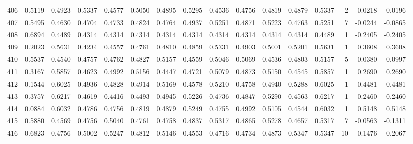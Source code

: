 \begin{tabular}{lrrrrrrrrrrrrrrr}
406 &      0.5119 &  0.4923 &  0.5337 &  0.4577 &  0.5050 &  0.4895 &  0.5295 &  0.4536 &  0.4756 &  0.4819 &   0.4879 &     0.5337 &      2 &                    0.0218 &                    -0.0196 \\
407 &      0.5495 &  0.4630 &  0.4704 &  0.4733 &  0.4824 &  0.4764 &  0.4937 &  0.5251 &  0.4871 &  0.5223 &   0.4763 &     0.5251 &      7 &                   -0.0244 &                    -0.0865 \\
408 &      0.6894 &  0.4489 &  0.4314 &  0.4314 &  0.4314 &  0.4314 &  0.4314 &  0.4314 &  0.4314 &  0.4314 &   0.4314 &     0.4489 &      1 &                   -0.2405 &                    -0.2405 \\
409 &      0.2023 &  0.5631 &  0.4234 &  0.4557 &  0.4761 &  0.4810 &  0.4859 &  0.5331 &  0.4903 &  0.5001 &   0.5201 &     0.5631 &      1 &                    0.3608 &                     0.3608 \\
410 &      0.5537 &  0.4540 &  0.4757 &  0.4762 &  0.4827 &  0.5157 &  0.4559 &  0.5046 &  0.5069 &  0.4536 &   0.4803 &     0.5157 &      5 &                   -0.0380 &                    -0.0997 \\
411 &      0.3167 &  0.5857 &  0.4623 &  0.4992 &  0.5156 &  0.4447 &  0.4721 &  0.5079 &  0.4873 &  0.5150 &   0.4545 &     0.5857 &      1 &                    0.2690 &                     0.2690 \\
412 &      0.1544 &  0.6025 &  0.4936 &  0.4828 &  0.4914 &  0.5169 &  0.4578 &  0.5210 &  0.4758 &  0.4940 &   0.5288 &     0.6025 &      1 &                    0.4481 &                     0.4481 \\
413 &      0.3757 &  0.6217 &  0.4619 &  0.4416 &  0.4493 &  0.4945 &  0.5226 &  0.4736 &  0.4847 &  0.5290 &   0.4563 &     0.6217 &      1 &                    0.2460 &                     0.2460 \\
414 &      0.0884 &  0.6032 &  0.4786 &  0.4756 &  0.4819 &  0.4879 &  0.5249 &  0.4755 &  0.4992 &  0.5105 &   0.4544 &     0.6032 &      1 &                    0.5148 &                     0.5148 \\
415 &      0.5880 &  0.4569 &  0.4756 &  0.5040 &  0.4761 &  0.4758 &  0.4837 &  0.5317 &  0.4865 &  0.5278 &   0.4657 &     0.5317 &      7 &                   -0.0563 &                    -0.1311 \\
416 &      0.6823 &  0.4756 &  0.5002 &  0.5247 &  0.4812 &  0.5146 &  0.4553 &  0.4716 &  0.4734 &  0.4873 &   0.5347 &     0.5347 &     10 &                   -0.1476 &                    -0.2067 \\

\end{tabular}
